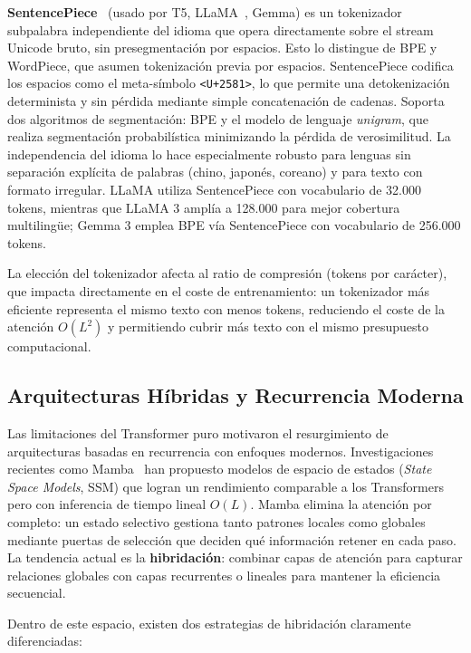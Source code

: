 \textbf{SentencePiece}~\cite{kudo2018sentencepiece} (usado por T5, LLaMA~\cite{touvron2023llama}, Gemma) es un tokenizador subpalabra independiente del idioma que opera directamente sobre el stream Unicode bruto, sin presegmentación por espacios. Esto lo distingue de BPE y WordPiece, que asumen tokenización previa por espacios. SentencePiece codifica los espacios como el meta-símbolo \texttt{<U+2581>}, lo que permite una detokenización determinista y sin pérdida mediante simple concatenación de cadenas. Soporta dos algoritmos de segmentación: BPE y el modelo de lenguaje \textit{unigram}, que realiza segmentación probabilística minimizando la pérdida de verosimilitud. La independencia del idioma lo hace especialmente robusto para lenguas sin separación explícita de palabras (chino, japonés, coreano) y para texto con formato irregular. LLaMA utiliza SentencePiece con vocabulario de 32.000 tokens, mientras que LLaMA 3 amplía a 128.000 para mejor cobertura multilingüe; Gemma 3 emplea BPE vía SentencePiece con vocabulario de 256.000 tokens.

La elección del tokenizador afecta al ratio de compresión (tokens por carácter), que impacta directamente en el coste de entrenamiento: un tokenizador más eficiente representa el mismo texto con menos tokens, reduciendo el coste de la atención $O(L^2)$ y permitiendo cubrir más texto con el mismo presupuesto computacional.

\subsection{Arquitecturas Híbridas y Recurrencia Moderna}

Las limitaciones del Transformer puro motivaron el resurgimiento de arquitecturas basadas en recurrencia con enfoques modernos. Investigaciones recientes como Mamba~\cite{gu2023mamba} han propuesto modelos de espacio de estados (\textit{State Space Models}, SSM) que logran un rendimiento comparable a los Transformers pero con inferencia de tiempo lineal $O(L)$. Mamba elimina la atención por completo: un estado selectivo gestiona tanto patrones locales como globales mediante puertas de selección que deciden qué información retener en cada paso. La tendencia actual es la \textbf{hibridación}: combinar capas de atención para capturar relaciones globales con capas recurrentes o lineales para mantener la eficiencia secuencial.

Dentro de este espacio, existen dos estrategias de hibridación claramente diferenciadas:

